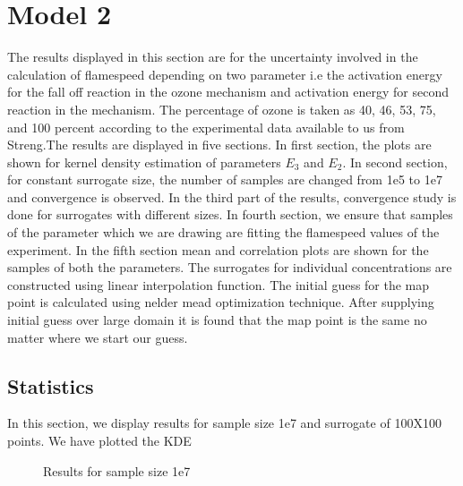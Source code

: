 \section{Model 2}

The results displayed in this section are for the uncertainty involved in the calculation of flamespeed depending  on two parameter i.e the activation energy for the fall off reaction in the ozone mechanism and activation energy for second reaction in the mechanism. The percentage of ozone is taken as 40, 46, 53, 75, and 100  percent according to the experimental data available to us from Streng\cite{Streng}.The results are displayed in five sections. In first section, the plots are shown for kernel density estimation of parameters $E_3$ and $E_2$. In second section, for constant surrogate size, the number of samples are changed from 1e5 to 1e7 and convergence is observed. In the third part of the results, convergence study is done for surrogates with different sizes. In fourth section, we ensure that samples of the parameter which we are drawing are fitting the flamespeed values of the experiment. In the fifth section mean and correlation plots are shown for the samples of both the parameters. The surrogates for individual concentrations are constructed using linear interpolation function. The initial guess for the map point is calculated using nelder mead optimization technique. After supplying initial guess over large domain it is found that the map point is the same no matter where we start our guess.


\subsection{ Statistics }

 In this section, we display results for sample size 1e7 and surrogate of 100X100 points. We  have plotted the KDE

\begin{figure}[H]
\centering
{}
    \caption{Results for sample size 1e7}
\end{figure}


